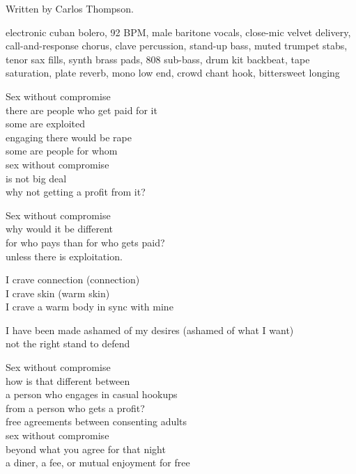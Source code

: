 
\label{sec:connection}
\begin{notes}
Written by Carlos Thompson.
\end{notes}
\begin{style}
electronic cuban bolero, 92 BPM, male baritone vocals, close-mic velvet delivery, call-and-response chorus, clave percussion, stand-up bass, muted trumpet stabs, tenor sax fills, synth brass pads, 808 sub-bass, drum kit backbeat, tape saturation, plate reverb, mono low end, crowd chant hook, bittersweet longing
\end{style}
\begin{lyrics}
Sex without compromise\\
there are people who get paid for it\\
some are exploited\\
engaging there would be rape\\
some are people for whom\\
sex without compromise\\
is not big deal\\
why not getting a profit from it?

Sex without compromise\\
why would it be different\\
for who pays than for who gets paid?\\
unless there is exploitation.

I crave connection (connection)\\
I crave skin (warm skin)\\
I crave a warm body in sync with mine

I have been made ashamed of my desires
(ashamed of what I want)\\
not the right stand to defend

Sex without compromise\\
how is that different between\\
a person who engages in casual hookups\\
from a person who gets a profit?\\
free agreements between consenting adults\\
sex without compromise\\
beyond what you agree for that night\\
a diner, a fee, or mutual enjoyment for free


\end{lyrics}
